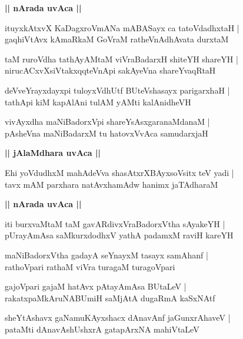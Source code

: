 \documentclass[twoside,12pt,openright]{book}
\newcounter{shloka}[chapter]
\def\uvaca#1{\centerline{{\large\textbf{#1}}}}
\begin{document}
\uvaca{|| nArada uvAca ||}

\begin{shloka}%
ituyxkAtxvX KaDagxroVmANa mABASayx ca tatoVdadhxtaH |\\
gaqhiVtAvx kAmaRkaM GoVraM ratheVnAdhAvata durxtaM 
\end{shloka}

\begin{shloka}%
taM ruroVdha tathAyAMtaM viVraBadarxH shiteYH shareYH |\\
nirucACxvXsiVtakxqqteVnApi sakAyeVna shareYvaqRtaH 
\end{shloka}

\begin{shloka}%
deVveYrayxdayxpi tuloyxVdhUtf BUteVshasayx parigarxhaH |\\
tathApi kiM kapAlAni  tulAM yAMti kalAnidheVH 
\end{shloka}

\begin{shloka}%
vivAyxdha maNiBadorxVpi shareYsAsxgaranaMdanaM |\\
pAsheVna maNiBadarxM tu hatovxVvAca samudarxjaH
\end{shloka}

\uvaca{|| jAlaMdhara uvAca ||}

\begin{shloka}%
Ehi yoVdudhxM mahAdeVva shasAtxrXBAyxsoVsitx teV yadi |\\
tavx mAM parxhara natAvxhamAdw hanimx jaTAdharaM 
\end{shloka}

\uvaca{|| nArada uvAca ||}

\begin{shloka}%
iti burxvaMtaM taM gavARdivxVraBadorxVtha sAyakeYH |\\
pUrayAmAsa saMkurxdodhxV yathA padamxM raviH kareYH
\end{shloka}

\begin{shloka}%
maNiBadorxVtha gadayA seYnayxM tasayx samAhanf |\\
rathoVpari rathaM viVra turagaM turagoVpari
\end{shloka}

\begin{shloka}%
gajoVpari gajaM hatAvx pAtayAmAsa BUtaLeV |\\
rakatxpaMkAruNABUmiH saMjAtA dugaRmA kaSxNAtf
\end{shloka}

\begin{shloka}%
sheYtAshavx gaNamuKAyxshacx dAnavAnf jaGunxrAhaveV |\\
pataMti dAnavAshUshxrA gatapArxNA mahiVtaLeV 
\end{shloka}
\end{document}
